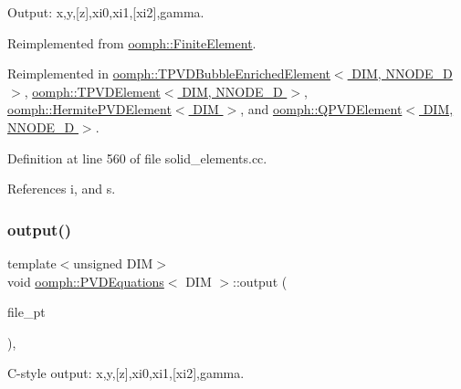 Output\+: x,y,\mbox{[}z\mbox{]},xi0,xi1,\mbox{[}xi2\mbox{]},gamma. 



Reimplemented from \hyperlink{classoomph_1_1FiniteElement_afa9d9b2670f999b43e6679c9dd28c457}{oomph\+::\+Finite\+Element}.



Reimplemented in \hyperlink{classoomph_1_1TPVDBubbleEnrichedElement_a88ae1b66e5b6ca42c88046f615632c0a}{oomph\+::\+T\+P\+V\+D\+Bubble\+Enriched\+Element$<$ D\+I\+M, N\+N\+O\+D\+E\+\_\+D $>$}, \hyperlink{classoomph_1_1TPVDElement_a16716e0b772f7a13b885faeb4def1cfa}{oomph\+::\+T\+P\+V\+D\+Element$<$ D\+I\+M, N\+N\+O\+D\+E\+\_\+D $>$}, \hyperlink{classoomph_1_1HermitePVDElement_a9de8d6a3b4e844189a97eb19e7b034c1}{oomph\+::\+Hermite\+P\+V\+D\+Element$<$ D\+I\+M $>$}, and \hyperlink{classoomph_1_1QPVDElement_a15611416b32a40e0aa67261e8c0a1188}{oomph\+::\+Q\+P\+V\+D\+Element$<$ D\+I\+M, N\+N\+O\+D\+E\+\_\+D $>$}.



Definition at line 560 of file solid\+\_\+elements.\+cc.



References i, and s.

\mbox{\label{classoomph_1_1PVDEquations_ae5cf4a0254fbb7db5d255db69cfb810e}} 
\subsubsection{\texorpdfstring{output()}{output()}\hspace{0.1cm}{\footnotesize\ttfamily [3/4]}}
{\footnotesize\ttfamily template$<$unsigned D\+IM$>$ \\
void \hyperlink{classoomph_1_1PVDEquations}{oomph\+::\+P\+V\+D\+Equations}$<$ D\+IM $>$\+::output (\begin{DoxyParamCaption}\item[{F\+I\+LE $\ast$}]{file\+\_\+pt }\end{DoxyParamCaption})\hspace{0.3cm}{\ttfamily [inline]}, {\ttfamily [virtual]}}



C-\/style output\+: x,y,\mbox{[}z\mbox{]},xi0,xi1,\mbox{[}xi2\mbox{]},gamma. 



